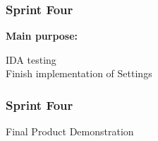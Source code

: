 \begin{frame}
\frametitle{Sprint Four}
\textbf{Main purpose:}\\
\begin{center}
IDA testing\\
\pause
{ Finish implementation of Settings}\\
\end{center}
\end{frame}

\begin{frame}
\frametitle{Sprint Four}
\begin{center}
Final Product Demonstration
\end{center}
\end{frame}